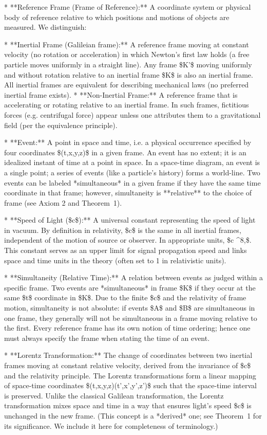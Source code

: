 \documentclass{article}
\begin{document}
* **Reference Frame (Frame of Reference):** A coordinate system or physical body of reference relative to which positions and motions of objects are measured. We distinguish:

  * **Inertial Frame (Galileian frame):** A reference frame moving at constant velocity (no rotation or acceleration) in which Newton’s first law holds (a free particle moves uniformly in a straight line). Any frame \$K'\$ moving uniformly and without rotation relative to an inertial frame \$K\$ is also an inertial frame. All inertial frames are equivalent for describing mechanical laws (no preferred inertial frame exists).
  * **Non-Inertial Frame:** A reference frame that is accelerating or rotating relative to an inertial frame. In such frames, fictitious forces (e.g. centrifugal force) appear unless one attributes them to a gravitational field (per the equivalence principle).

* **Event:** A point in space and time, i.e. a physical occurrence specified by four coordinates \$(t,x,y,z)\$ in a given frame. An event has no extent; it is an idealized instant of time at a point in space. In a space-time diagram, an event is a single point; a series of events (like a particle’s history) forms a world-line. Two events can be labeled *simultaneous* in a given frame if they have the same time coordinate in that frame; however, simultaneity is **relative** to the choice of frame (see Axiom 2 and Theorem 1).

* **Speed of Light (\$c\$):** A universal constant representing the speed of light in vacuum. By definition in relativity, \$c\$ is the same in all inertial frames, independent of the motion of source or observer. In appropriate units, \$c ^8,\$. This constant serves as an upper limit for signal propagation speed and links space and time units in the theory (often set to 1 in relativistic units).

* **Simultaneity (Relative Time):** A relation between events as judged within a specific frame. Two events are *simultaneous* in frame \$K\$ if they occur at the same \$t\$ coordinate in \$K\$. Due to the finite \$c\$ and the relativity of frame motion, simultaneity is not absolute: if events \$A\$ and \$B\$ are simultaneous in one frame, they generally will not be simultaneous in a frame moving relative to the first. Every reference frame has its own notion of time ordering; hence one must always specify the frame when stating the time of an event.

* **Lorentz Transformation:** The change of coordinates between two inertial frames moving at constant relative velocity, derived from the invariance of \$c\$ and the relativity principle. The Lorentz transformations form a linear mapping of space-time coordinates \$(t,x,y,z)\mapsto(t',x',y',z')\$ such that the space-time interval is preserved. Unlike the classical Galilean transformation, the Lorentz transformation mixes space and time in a way that ensures light’s speed \$c\$ is unchanged in the new frame. (This concept is a *derived* one; see Theorem 1 for its significance. We include it here for completeness of terminology.)
\end{document}
